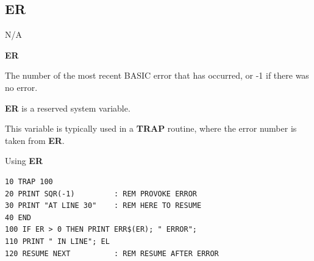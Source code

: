 \subsection{ER}
\begin{description}[leftmargin=2cm,style=nextline]
\item [Token:]    N/A

\item [Format:]   {\bf ER}

\item [Usage:]    The number of the most recent BASIC error that has occurred, or -1 if there was no error.

\item [Remarks:]  {\bf ER} is a reserved system variable.

                  This variable is typically used in a {\bf TRAP} routine, where the error number is taken from {\bf ER}.

\item [Example:]  Using {\bf ER}

\begin{tcolorbox}[colback=black,coltext=white]
\verbatimfont{\codefont}
\begin{verbatim}
10 TRAP 100
20 PRINT SQR(-1)         : REM PROVOKE ERROR
30 PRINT "AT LINE 30"    : REM HERE TO RESUME
40 END
100 IF ER > 0 THEN PRINT ERR$(ER); " ERROR";
110 PRINT " IN LINE"; EL
120 RESUME NEXT          : REM RESUME AFTER ERROR
\end{verbatim}
\end{tcolorbox}
\end{description}


\newpage
